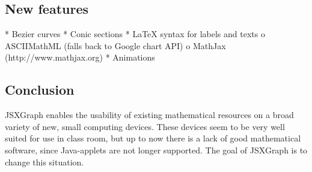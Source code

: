 \documentclass[12pt,a4paper]{article}%
\begin{document}
\subsection{New features}
    * Bezier curves
    * Conic sections
    * \LaTeX{} syntax for labels and texts
          o ASCIIMathML (falls back to Google chart API)
          o MathJax (http://www.mathjax.org)
    * Animations

\subsection{Conclusion}
JSXGraph enables the usability of existing mathematical resources on a broad variety of new, small computing devices. These devices seem to be very well suited for use in class room, but up to now there is a lack of good mathematical software, since Java-applets are not longer supported. The goal of JSXGraph is to change this situation.
\end{document}

